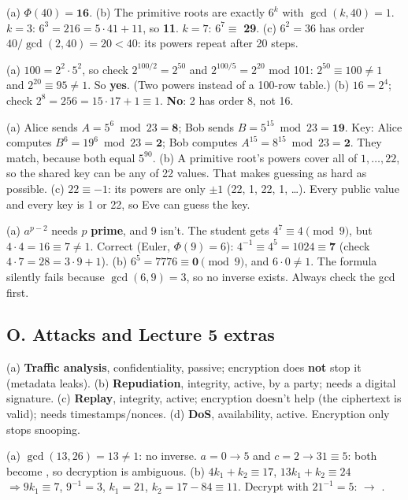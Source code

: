 \ans (a) $\Phi(40) = \mathbf{16}$.
(b) The primitive roots are exactly $6^k$ with $\gcd(k, 40) = 1$. $k = 3$: $6^3 = 216 = 5\cdot41 + 11$, so \textbf{11}. $k = 7$: $6^7 \equiv$ \textbf{29}.
(c) $6^2 = 36$ has order $40/\gcd(2, 40) = 20 < 40$: its powers repeat after 20 steps.

\ans (a) $100 = 2^2\cdot5^2$, so check $2^{100/2} = 2^{50}$ and $2^{100/5} = 2^{20}$ mod 101: $2^{50} \equiv 100 \ne 1$ and $2^{20} \equiv 95 \ne 1$. So \textbf{yes}. (Two powers instead of a 100-row table.)
(b) $16 = 2^4$; check $2^8 = 256 = 15\cdot17 + 1 \equiv 1$. \textbf{No}: 2 has order 8, not 16.

\ans (a) Alice sends $A = 5^6 \bmod 23 = \mathbf{8}$; Bob sends $B = 5^{15} \bmod 23 = \mathbf{19}$.
Key: Alice computes $B^6 = 19^6 \bmod 23 = \mathbf{2}$; Bob computes $A^{15} = 8^{15} \bmod 23 = \mathbf{2}$. They match, because both equal $5^{90}$.
(b) A primitive root's powers cover all of $1, \dots, 22$, so the shared key can be any of 22 values. That makes guessing as hard as possible.
(c) $22 \equiv -1$: its powers are only $\pm1$ (22, 1, 22, 1, \dots). Every public value and every key is 1 or 22, so Eve can guess the key.

\ans (a) $a^{p-2}$ needs $p$ \textbf{prime}, and 9 isn't. The student gets $4^7 \equiv 4 \pmod 9$, but $4\cdot4 = 16 \equiv 7 \ne 1$.
Correct (Euler, $\Phi(9) = 6$): $4^{-1} \equiv 4^5 = 1024 \equiv \mathbf{7}$ (check $4\cdot7 = 28 = 3\cdot9 + 1$).
(b) $6^5 = 7776 \equiv \mathbf{0} \pmod 9$, and $6 \cdot 0 \ne 1$. The formula silently fails because $\gcd(6, 9) = 3$, so no inverse exists. Always check the gcd first.

\subsection*{O. Attacks and Lecture 5 extras}
\ans (a) \textbf{Traffic analysis}, confidentiality, passive; encryption does \textbf{not} stop it (metadata leaks). (b) \textbf{Repudiation}, integrity, active, by a party; needs a digital signature. (c) \textbf{Replay}, integrity, active; encryption doesn't help (the ciphertext is valid); needs timestamps/nonces. (d) \textbf{DoS}, availability, active. Encryption only stops snooping.

\ans (a) $\gcd(13, 26) = 13 \ne 1$: no inverse. $a = 0 \to 5$ and $c = 2 \to 31 \equiv 5$: both become , so decryption is ambiguous. (b) $4k_1 + k_2 \equiv 17$, $13k_1 + k_2 \equiv 24$ $\Rightarrow 9k_1 \equiv 7$, $9^{-1} = 3$, $k_1 = 21$, $k_2 = 17 - 84 \equiv 11$. Decrypt with $21^{-1} = 5$:  $\to$ \textbf{}.

